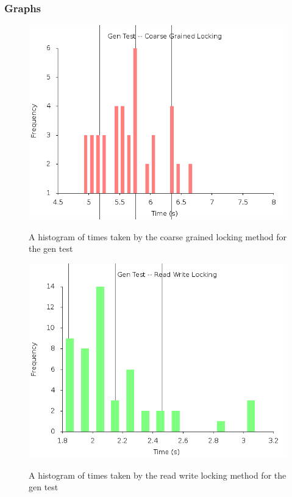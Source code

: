 \documentclass[paper=a4, fontsize=11pt]{scrartcl} %
\numberwithin{equation}{section} %
\numberwithin{figure}{section} %
\numberwithin{table}{section} %
\begin{document}
\subsubsection{Graphs}
\begin{figure}[h]
  \caption{A histogram of times taken by the coarse grained locking method for the gen test} 
  \centering
  \includegraphics[width=\textwidth]{gen_server_coarse_final.png}
  \label{fig:gen_coarse}
\end{figure}

\begin{figure}[h]
  \caption{A histogram of times taken by the read write locking method for the gen test} 
  \centering
  \includegraphics[width=\textwidth]{gen_server_rw_final.png}
  \label{fig:gen_rw}
\end{figure}
\end{document}
